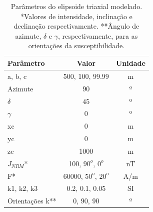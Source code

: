 \begin{table}[h!]
	\begin{center}
		\begin{tabular}{|l|c|c|}
			\hline
			\textbf{Parâmetro}  & \textbf{Valor}  & \textbf{Unidade} \\
			\hline 
			a, b, c  & 500, 100, 99.99 & m\\
			\hline
			Azimute   & $90$ & º\\
			\hline
			$\delta$    & $45$ & º\\
			\hline
			$\gamma$   & $0$  & º\\
			\hline
			xc   & 0 & m \\
			\hline          
			yc   & 0  & m\\
			\hline                
			zc   & 1000  & m\\
			\hline
			$J_{NRM}$*  & 100, $90^o$, $0^o$  & nT\\
			\hline
			F*    & 60000, $50^o$, $20^o$ & A/m\\
			\hline
			k1, k2, k3   & 0.2, 0.1, 0.05  & SI\\
			\hline
			Orientações k**   & $0$, $90$, $90$  & º\\
			\hline
		\end{tabular}
		\caption{Parâmetros do elipsoide triaxial modelado. *Valores de intensidade, inclinação e declinação respectivamente. **Ângulo de azimute, $\delta$ e $\gamma$, respectivamente, para as orientações da susceptibilidade.}
	\end{center}
	\label{tab:triaxial_prolate1}
\end{table}

\vspace{3cm}


